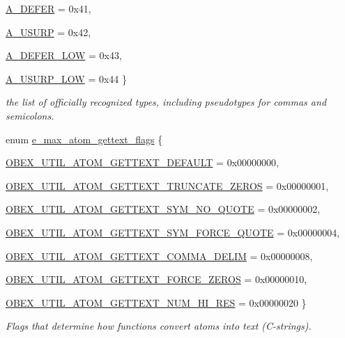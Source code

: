 \begin{DoxyCompactItemize}
\par
\hyperlink{group__atom_gga8aa6700e9f00b132eb376db6e39ade47abcb435e6fecfdcd79276dc8db1988db3}{A\_\-DEFER} =  0x41, 
\par
\hyperlink{group__atom_gga8aa6700e9f00b132eb376db6e39ade47af563cdbe6db453f24552bbe7fe6762d8}{A\_\-USURP} =  0x42, 
\par
\hyperlink{group__atom_gga8aa6700e9f00b132eb376db6e39ade47a4556bc5fe0d4f8cc55eda5aeeee55cf2}{A\_\-DEFER\_\-LOW} =  0x43, 
\par
\hyperlink{group__atom_gga8aa6700e9f00b132eb376db6e39ade47a8c844b0a1b551341a6a5e3b95d2f1152}{A\_\-USURP\_\-LOW} =  0x44
 \}
\begin{DoxyCompactList}\small\item\em the list of officially recognized types, including pseudotypes for commas and semicolons. \item\end{DoxyCompactList}\item 
enum \hyperlink{group__atom_ga42fa1c131691f55dbc781a0be60e3772}{e\_\-max\_\-atom\_\-gettext\_\-flags} \{ \par
\hyperlink{group__atom_gga42fa1c131691f55dbc781a0be60e3772a2e8bad722419a8be35f8ef13364ddcc7}{OBEX\_\-UTIL\_\-ATOM\_\-GETTEXT\_\-DEFAULT} =  0x00000000, 
\par
\hyperlink{group__atom_gga42fa1c131691f55dbc781a0be60e3772a433f595f519e0a4051d769db66b9b5d8}{OBEX\_\-UTIL\_\-ATOM\_\-GETTEXT\_\-TRUNCATE\_\-ZEROS} =  0x00000001, 
\par
\hyperlink{group__atom_gga42fa1c131691f55dbc781a0be60e3772a639f398e983f74ee2adbf39a69062a93}{OBEX\_\-UTIL\_\-ATOM\_\-GETTEXT\_\-SYM\_\-NO\_\-QUOTE} =  0x00000002, 
\par
\hyperlink{group__atom_gga42fa1c131691f55dbc781a0be60e3772a8adcad05a635857f1f76aec4188e9ae9}{OBEX\_\-UTIL\_\-ATOM\_\-GETTEXT\_\-SYM\_\-FORCE\_\-QUOTE} =  0x00000004, 
\par
\hyperlink{group__atom_gga42fa1c131691f55dbc781a0be60e3772a45021a54b7ef864284a15b898d169a13}{OBEX\_\-UTIL\_\-ATOM\_\-GETTEXT\_\-COMMA\_\-DELIM} =  0x00000008, 
\par
\hyperlink{group__atom_gga42fa1c131691f55dbc781a0be60e3772a6cffcc55e28bd69beb674fe018c18e35}{OBEX\_\-UTIL\_\-ATOM\_\-GETTEXT\_\-FORCE\_\-ZEROS} =  0x00000010, 
\par
\hyperlink{group__atom_gga42fa1c131691f55dbc781a0be60e3772a9a254b928e25b9023b6e3bb6b25f35b7}{OBEX\_\-UTIL\_\-ATOM\_\-GETTEXT\_\-NUM\_\-HI\_\-RES} =  0x00000020
 \}
\begin{DoxyCompactList}\small\item\em Flags that determine how functions convert atoms into text (C-\/strings). \item\end{DoxyCompactList}\end{DoxyCompactItemize}
